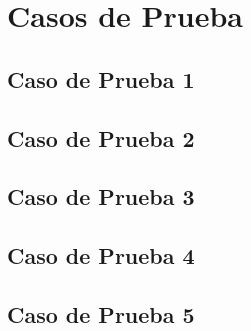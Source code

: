 \documentclass[11pt,letter]{article}
\begin{document}
\section{Casos de Prueba}
\subsection{Caso de Prueba 1}
\subsection{Caso de Prueba 2}
\subsection{Caso de Prueba 3}
\subsection{Caso de Prueba 4}
\subsection{Caso de Prueba 5}
\end{document}

